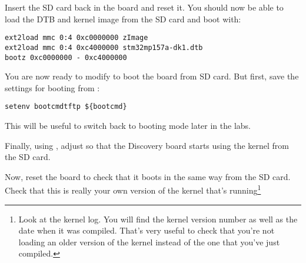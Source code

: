 Insert the SD card back in the board and reset it. You should now be
able to load the DTB and kernel image from the SD card and boot with:

\begin{verbatim}
ext2load mmc 0:4 0xc0000000 zImage
ext2load mmc 0:4 0xc4000000 stm32mp157a-dk1.dtb
bootz 0xc0000000 - 0xc4000000
\end{verbatim}

You are now ready to modify  to boot the board
from SD card. But first, save the settings for booting from
:

\begin{verbatim}
setenv bootcmdtftp ${bootcmd}
\end{verbatim}

This will be useful to switch back to  booting mode
later in the labs.

Finally, using , adjust  so that
the Discovery board starts using the kernel from the SD card.

Now, reset the board to check that it boots in the same way from the
SD card. Check that this is really your own version of the kernel
that's running\footnote{Look at the kernel log. You will find the
kernel version number as well as the date when it was compiled.
That's very useful to check that you're not loading an older version
of the kernel instead of the one that you've just compiled.}
